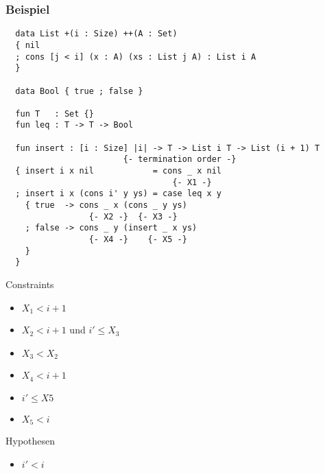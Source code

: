 \documentclass[hyperref={pdfpagelabels=false}]{beamer}
\begin{document}
\begin{frame}[fragile]
	\frametitle{Beispiel}
	\tiny
	\begin{verbatim}
  data List +(i : Size) ++(A : Set)
  { nil
  ; cons [j < i] (x : A) (xs : List j A) : List i A
  }

  data Bool { true ; false }
  
  fun T   : Set {}
  fun leq : T -> T -> Bool
  
  fun insert : [i : Size] |i| -> T -> List i T -> List (i + 1) T
                        {- termination order -}
  { insert i x nil            = cons _ x nil
                                  {- X1 -}
  ; insert i x (cons i' y ys) = case leq x y
    { true  -> cons _ x (cons _ y ys)
                 {- X2 -}  {- X3 -}
    ; false -> cons _ y (insert _ x ys)
                 {- X4 -}    {- X5 -}
    }
  }
	\end{verbatim}
	\begin{minipage}{30em}
		\begin{block}{Constraints}
			\tiny
			\begin{minipage}{14em}
				\begin{itemize}
					\item $X_1 < i + 1$
					\item $X_2 < i + 1$ und $i' \leq X_3$
					\item $X_3 < X_2$
				\end{itemize}
			\end{minipage}
			\begin{minipage}{14em}
				\begin{itemize}
					\item $X_4 < i + 1$
					\item $i' \leq X5$
					\item $X_5 < i$
				\end{itemize}
			\end{minipage}
		\end{block}
	\end{minipage}
	\begin{minipage}{10em}
		\begin{block}{Hypothesen}
			\tiny
			\begin{itemize}
				\item $i' < i$
			\end{itemize}
		\end{block}
	\end{minipage}
\end{frame}
\end{document}
